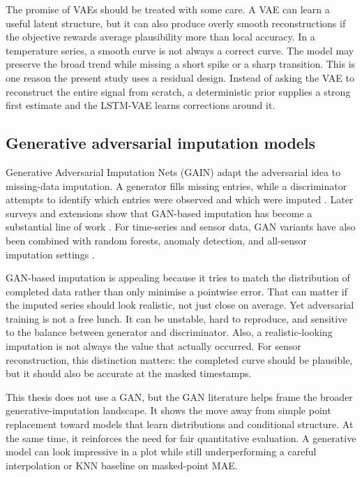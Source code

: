 The promise of VAEs should be treated with some care. A VAE can learn a useful latent structure, but it can also produce overly smooth reconstructions if the objective rewards average plausibility more than local accuracy. In a temperature series, a smooth curve is not always a correct curve. The model may preserve the broad trend while missing a short spike or a sharp transition. This is one reason the present study uses a residual design. Instead of asking the VAE to reconstruct the entire signal from scratch, a deterministic prior supplies a strong first estimate and the LSTM-VAE learns corrections around it.

\subsection{Generative adversarial imputation models}

Generative Adversarial Imputation Nets (GAIN) adapt the adversarial idea to missing-data imputation. A generator fills missing entries, while a discriminator attempts to identify which entries were observed and which were imputed \cite{Yoon2018GAINMD}. Later surveys and extensions show that GAN-based imputation has become a substantial line of work \cite{Shahbazian2023GenerativeAN}. For time-series and sensor data, GAN variants have also been combined with random forests, anomaly detection, and all-sensor imputation settings \cite{Zhao2024SGADGANSG,Xie2025AnEG}.

GAN-based imputation is appealing because it tries to match the distribution of completed data rather than only minimise a pointwise error. That can matter if the imputed series should look realistic, not just close on average. Yet adversarial training is not a free lunch. It can be unstable, hard to reproduce, and sensitive to the balance between generator and discriminator. Also, a realistic-looking imputation is not always the value that actually occurred. For sensor reconstruction, this distinction matters: the completed curve should be plausible, but it should also be accurate at the masked timestamps.

This thesis does not use a GAN, but the GAN literature helps frame the broader generative-imputation landscape. It shows the move away from simple point replacement toward models that learn distributions and conditional structure. At the same time, it reinforces the need for fair quantitative evaluation. A generative model can look impressive in a plot while still underperforming a careful interpolation or KNN baseline on masked-point MAE.

